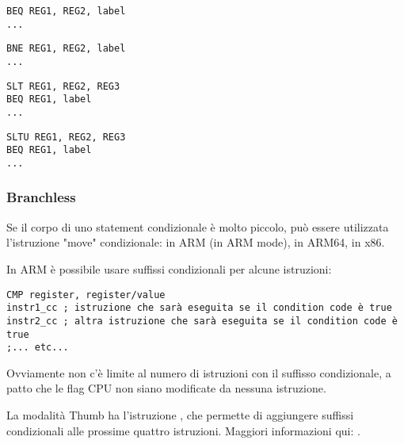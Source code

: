 \begin{lstlisting}[caption=Check for equal values,style=customasmMIPS]
BEQ REG1, REG2, label
...
\end{lstlisting}

\begin{lstlisting}[caption=Check for non-equal values,style=customasmMIPS]
BNE REG1, REG2, label
...
\end{lstlisting}

\begin{lstlisting}[caption=Check for less than (signed),style=customasmMIPS]
SLT REG1, REG2, REG3
BEQ REG1, label
...
\end{lstlisting}

\begin{lstlisting}[caption=Check for less than (unsigned),style=customasmMIPS]
SLTU REG1, REG2, REG3
BEQ REG1, label
...
\end{lstlisting}

\subsubsection{Branchless}

Se il corpo di uno statement condizionale è molto piccolo, può essere utilizzata l'istruzione "move" condizionale: 
 in ARM (in ARM mode),  in ARM64,  in x86.


In ARM è possibile usare suffissi condizionali per alcune istruzioni:

\begin{lstlisting}[caption=ARM (\ARMMode),style=customasmARM]
CMP register, register/value
instr1_cc ; istruzione che sarà eseguita se il condition code è true
instr2_cc ; altra istruzione che sarà eseguita se il condition code è true
;... etc...
\end{lstlisting}

Ovviamente non c'è limite al numero di istruzioni con il suffisso condizionale, a patto che le flag CPU non siano modificate da nessuna istruzione. 


La modalità Thumb ha l'istruzione , che permette di aggiungere suffissi condizionali alle prossime quattro istruzioni.
Maggiori informazioni qui: .

